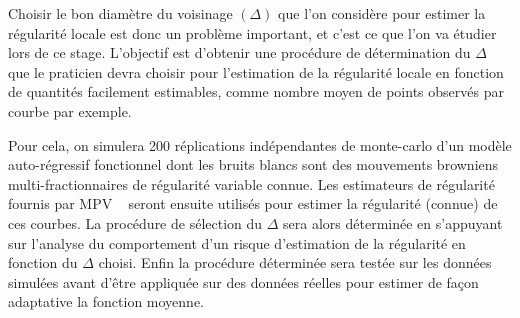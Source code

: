 Choisir le bon diamètre du voisinage $(\Delta)$ que l'on considère pour estimer la régularité locale est donc un problème important, et c'est ce que l'on va étudier lors de ce stage. L'objectif est d'obtenir une procédure de détermination du $\Delta$ que le praticien devra choisir pour l'estimation de la régularité locale en fonction de quantités facilement estimables, comme nombre moyen de points observés par courbe par exemple.

Pour cela, on simulera 200 réplications indépendantes de monte-carlo d'un modèle auto-régressif fonctionnel dont les bruits blancs sont des mouvements browniens multi-fractionnaires de régularité variable connue. Les estimateurs de régularité fournis par MPV ~\cite{maissoro-SmoothnessFTSweakDep} seront ensuite utilisés pour estimer la régularité (connue) de ces courbes. La procédure de sélection du $\Delta$ sera alors déterminée en s'appuyant sur l'analyse du comportement d'un risque d'estimation de la régularité en fonction du $\Delta$ choisi. Enfin la procédure déterminée sera testée sur les données simulées avant d'être appliquée sur des données réelles pour estimer de façon adaptative la fonction moyenne.